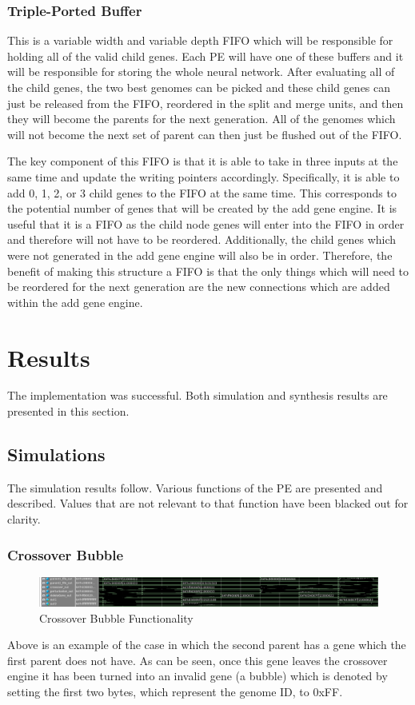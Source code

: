 \documentclass[preprint,pre,floats,aps,amsmath,amssymb]{revtex4}
\begin{document}
\subsubsection{Triple-Ported Buffer}

This is a variable width and variable depth FIFO which will be responsible for holding all of the valid child genes. Each PE will have one of these buffers and it will be responsible for storing the whole neural network. After evaluating all of the child genes, the two best genomes can be picked and these child genes can just be released from the FIFO, reordered in the split and merge units, and then they will become the parents for the next generation. All of the genomes which will not become the next set of parent can then just be flushed out of the FIFO.

The key component of this FIFO is that it is able to take in three inputs at the same time and update the writing pointers accordingly. Specifically, it is able to add 0, 1, 2, or 3 child genes to the FIFO at the same time. This corresponds to the potential number of genes that will be created by the add gene engine. It is useful that it is a FIFO as the child node genes will enter into the FIFO in order and therefore will not have to be reordered. Additionally, the child genes which were not generated in the add gene engine will also be in order. Therefore, the benefit of making this structure a FIFO is that the only things which will need to be reordered for the next generation are the new connections which are added within the add gene engine.


\section{Results}
The implementation was successful. Both simulation and synthesis results are presented in this section.
\subsection{Simulations}
The simulation results follow. Various functions of the PE are presented and described. Values that are not relevant to that function have been blacked out for clarity.

\subsubsection{Crossover Bubble}

\begin{figure}[htb!]
	\includegraphics[width=\textwidth]{Crossover_Bubble}
	\caption{Crossover Bubble Functionality}
\end{figure}
\FloatBarrier
Above is an example of the case in which the second parent has a gene which the first parent does not have. As can be seen, once this gene leaves the crossover engine it has been turned into an invalid gene (a bubble) which is denoted by setting the first two bytes, which represent the genome ID, to 0xFF.
\end{document}
